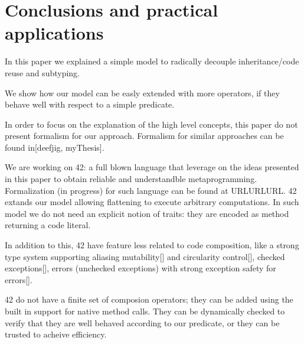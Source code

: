 \section{Conclusions and practical applications}

In this paper we explained a simple model to 
radically decouple inheritance/code reuse and subtyping.

We show how our model can be easly extended with more operators, if they behave well with respect to a simple predicate.

In order to focus on the explanation of the high level concepts, this paper do not present formalism for our approach.
Formalism for similar approaches can be found in[deefjig, myThesis].

We are working on 42: a full blown language 
that leverage on the ideas presented in this paper to obtain reliable and understandble metaprogramming.
Formalization (in progress) for such language can be found at URLURLURL.
42 extands our model allowing
flattening to execute arbitrary computations.
In such model we do not need an explicit notion of traits: they are encoded as method returning a code literal.

  In addition to this, 42 have feature less related to code composition, like
  a strong type system supporting aliasing mutability[] and circularity control[],
   checked exceptions[], errors (unchecked exceptions) with strong exception safety for errors[].

42 do not have a finite set of composion operators; they can be added using the built in support for native method calls. They can be dynamically checked to verify that they are well behaved according to our predicate, or they can be trusted to acheive efficiency. 



